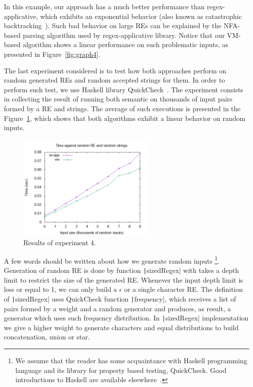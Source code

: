 \documentclass[oneside,12pt]{scrbook}
\newcommand{\haskell}[1]{\texttt|#1|}
\theoremstyle{definition}
\theoremstyle{plain}
\theoremstyle{definition}
\begin{document}
In this example, our approach has a much better performance than
regex-applicative, which exhibits an exponential behavior (also known as
catastrophic backtracking~\cite{Kirrage13}). Such bad 
behavior on large REs can be explained by the NFA-based parsing algorithm  
used by regex-applicative library. Notice that our VM-based algorithm shows 
a linear performance on such problematic inputs, as presented in
Figure~\ref{fig:graph4}.

The last experiment considered is to test how both approaches perform
on random generated REs and random accepted strings for them. In order to
perform such test, we use Haskell library QuickCheck~\cite{Claessen2000}.
The experiment consists in collecting the result of running both semantic 
on thousands of input pairs formed by a RE and strings. The average of such 
executions is presented in the Figure~\ref{fig:graph5}, which shows that both 
algorithms exhibit a linear behavior  on random inputs.

\begin{figure}[h]
\includegraphics[width=0.6\textwidth]{random.png}
\centering
\caption{Results of experiment 4.}
\label{fig:graph5}
\end{figure}

A few words should be written about how we generate random inputs
\footnote{We
assume that the reader has some acquaintance with Haskell programming language
and its library for property based testing, QuickCheck. Good introductions to
Haskell are available elsewhere~\cite{Lipovaca2011}.}. 
Generation of random RE is done by function \haskell{sizedRegex} with takes a depth limit to restrict
the size of the generated RE. Whenever the input depth limit is less or equal to 1, we can
only build a $\epsilon$ or a single character RE. The definition of \haskell{sizedRegex} uses
QuickCheck function \haskell{frequency}, which receives a list of pairs formed by a weight and
a random generator and produces, as result, a generator which uses such frequency distribution.
In \haskell{sizedRegex} implementation we give a higher weight to generate characters and equal distributions
to build concatenation, union or star.
\end{document}
